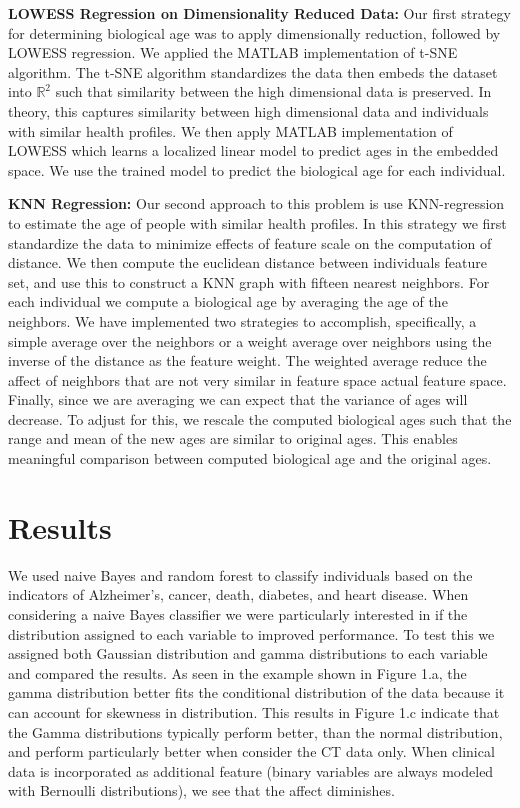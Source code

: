 \documentclass{article}
\begin{document}
\textbf{LOWESS Regression on Dimensionality Reduced Data:} Our first strategy for determining biological age was to apply dimensionally reduction, followed by LOWESS regression. We applied the MATLAB implementation of t-SNE algorithm. The t-SNE algorithm standardizes the data then embeds the dataset into $\mathbb{R}^2$ such that similarity between the high dimensional data is preserved. In theory, this captures similarity between high dimensional data and individuals with similar health profiles.  We then apply MATLAB implementation of LOWESS which learns a localized linear model to predict ages in the embedded space. We use the trained model to predict the biological age for each individual. 

\textbf{KNN Regression:}  Our second approach to this problem is use KNN-regression to estimate the age of people with similar health profiles. In this strategy we first standardize the data to minimize effects of feature scale on the computation of distance. We then compute the euclidean distance between individuals feature set, and use this to construct a KNN graph with fifteen nearest neighbors. For each individual we compute a biological age by averaging the age of the neighbors. We have implemented two strategies to accomplish, specifically, a simple average over the neighbors or a weight average over neighbors using the inverse of the distance as the feature weight. The weighted average reduce the affect of neighbors that are not very similar in feature space actual feature space. Finally, since we are averaging we can expect that the variance of ages will decrease. To adjust for this, we rescale the computed biological ages such that the range and mean of the new ages are similar to original ages. This enables meaningful comparison between computed biological age and the original ages. 


\section{Results}
We used naive Bayes and random forest to classify individuals based on the indicators of Alzheimer's, cancer, death, diabetes, and heart disease. When considering a naive Bayes classifier we were particularly interested in if the distribution assigned to each variable to improved performance. To test this we assigned both Gaussian distribution and gamma distributions to each variable and compared the results. As seen in the example shown in Figure 1.a, the gamma distribution better fits the conditional distribution of the data because it can account for skewness in distribution. This results in Figure 1.c indicate that the Gamma distributions typically perform better, than the normal distribution, and perform particularly better when consider the CT data only. When clinical data is incorporated as additional feature (binary variables are always modeled with Bernoulli distributions), we see that the affect diminishes. 
\end{document}
